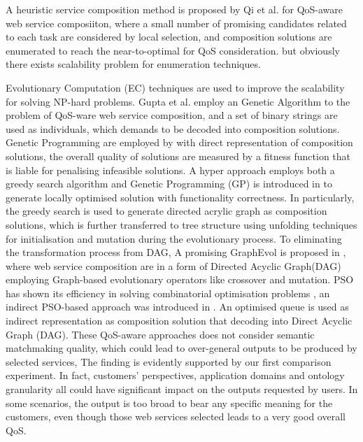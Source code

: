 \documentclass{IEEEtran}
\begin{document}
A heuristic service composition method is proposed by Qi et al. \cite{qi2010combining}for QoS-aware web service composiiton, where a small number of promising candidates related to each task are considered by local selection, and composition solutions are enumerated to reach the near-to-optimal for QoS consideration. but obviously there exists scalability problem for enumeration techniques. 

Evolutionary Computation (EC) techniques are used to improve the scalability for solving NP-hard problems. Gupta et al. \cite{gupta2015optimization} employ an Genetic Algorithm to the problem of QoS-ware web service composition, and a set of binary strings are used as individuals, which demands to be decoded into composition solutions. Genetic Programming are employed by  \cite{yu2013adaptive} with direct representation of composition solutions, the overall quality of solutions are measured by a fitness function that is liable for penalising infeasible solutions. A hyper approach employs both a greedy search algorithm and Genetic Programming (GP) is introduced in \cite{ma2015hybrid} to generate locally optimised solution with functionality correctness. In particularly, the greedy search is used to generate directed acrylic graph as composition solutions, which is further transferred to tree structure using unfolding techniques for initialisation and mutation during the evolutionary process. To eliminating the transformation process from DAG, A promising GraphEvol is proposed in \cite{da2015graphevol}, where web service composition are in a form of Directed Acyclic Graph(DAG) employing Graph-based evolutionary operators like crossover and mutation. PSO has shown its efficiency in solving combinatorial optimisation problems \cite{fukuyama2008fundamentals}, an indirect PSO-based approach was introduced in \cite{da2016particle}. An optimised queue is used as indirect representation as composition solution that decoding into Direct Acyclic Graph (DAG). These QoS-aware approaches does not consider semantic matchmaking quality, which could lead to over-general outputs to be produced by selected services, The finding is evidently supported by our first comparison experiment. In fact, customers' perspectives, application domains and ontology granularity all could have significant impact on the outputs requested by users. In some scenarios, the output is too broad to bear any specific meaning for the customers, even though those web services selected leads to a very good overall QoS.
\end{document}
